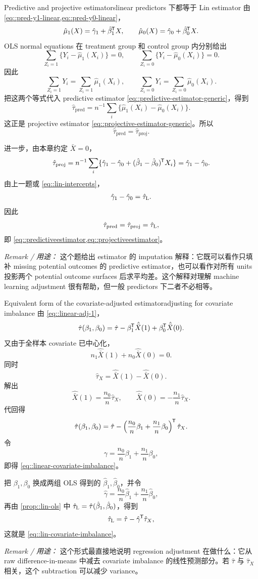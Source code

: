 \begin{exercisesolution}{Predictive and projective estimators}{linear predictors 下都等于 Lin estimator}
由 \cref{eq::pred-y1-linear,eq::pred-y0-linear}，
\[
\hat\mu_1(X)=\hat\gamma_1+\hat\beta_1^{\mkern-1.5mu\mathsf{T}} X,\qquad
\hat\mu_0(X)=\hat\gamma_0+\hat\beta_0^{\mkern-1.5mu\mathsf{T}} X.
\]
OLS normal equations 在 treatment group 和 control group 内分别给出
\[
\sum_{Z_i=1}\{Y_i-\hat\mu_1(X_i)\}=0,\qquad
\sum_{Z_i=0}\{Y_i-\hat\mu_0(X_i)\}=0.
\]
因此
\[
\sum_{Z_i=1}Y_i=\sum_{Z_i=1}\hat\mu_1(X_i),\qquad
\sum_{Z_i=0}Y_i=\sum_{Z_i=0}\hat\mu_0(X_i).
\]
把这两个等式代入 predictive estimator \cref{eq::predictive-estimator-generic}，得到
\[
\hat\tau_{\mathrm{pred}}
=n^{-1}\sum_i\{\hat\mu_1(X_i)-\hat\mu_0(X_i)\}.
\]
这正是 projective estimator \cref{eq::projective-estimator-generic}。所以
\[
\hat\tau_{\mathrm{pred}}=\hat\tau_{\mathrm{proj}}.
\]

进一步，由本章约定 $\bar X=0$，
\[
\hat\tau_{\mathrm{proj}}
=n^{-1}\sum_i
\{\hat\gamma_1-\hat\gamma_0+(\hat\beta_1-\hat\beta_0)^{\mkern-1.5mu\mathsf{T}} X_i\}
=\hat\gamma_1-\hat\gamma_0.
\]
由上一题或 \cref{eq::lin-intercepts}，
\[
\hat\gamma_1-\hat\gamma_0=\hat\tau_\textsc{L}.
\]
因此
\[
\hat\tau_{\mathrm{pred}}=\hat\tau_{\mathrm{proj}}=\hat\tau_\textsc{L},
\]
即 \cref{eq::predictiveestimator,eq::projectiveestimator}。

\emph{Remark / 用途：} 这个题给出 \citet{lin2013} estimator 的 imputation 解释：它既可以看作只填补 missing potential outcomes 的 predictive estimator，也可以看作对所有 units 投影两个 potential outcome surfaces 后求平均差。这个解释对理解 machine learning adjustment 很有帮助，但一般 predictors 下二者不必相等。
\end{exercisesolution}

\begin{exercisesolution}{Equivalent form of the covariate-adjusted estimator}{adjusting for covariate imbalance}
由 \cref{eq::linear-adj-1}，
\[
\hat\tau(\beta_1,\beta_0)
=\hat\tau-\beta_1^{\mkern-1.5mu\mathsf{T}}\hat{\bar X}(1)+\beta_0^{\mkern-1.5mu\mathsf{T}}\hat{\bar X}(0).
\]
又由于全样本 covariate 已中心化，
\[
n_1\hat{\bar X}(1)+n_0\hat{\bar X}(0)=0.
\]
同时
\[
\hat\tau_X=\hat{\bar X}(1)-\hat{\bar X}(0).
\]
解出
\[
\hat{\bar X}(1)=\frac{n_0}{n}\hat\tau_X,\qquad
\hat{\bar X}(0)=-\frac{n_1}{n}\hat\tau_X.
\]
代回得
\[
\hat\tau(\beta_1,\beta_0)
=\hat\tau-\left(\frac{n_0}{n}\beta_1+\frac{n_1}{n}\beta_0\right)^{\mkern-1.5mu\mathsf{T}}\hat\tau_X.
\]
令
\[
\gamma=\frac{n_0}{n}\beta_1+\frac{n_1}{n}\beta_0,
\]
即得 \cref{eq::linear-covariate-imbalance}。

把 $\beta_1,\beta_0$ 换成两组 OLS 得到的 $\hat\beta_1,\hat\beta_0$，并令
\[
\hat\gamma=\frac{n_0}{n}\hat\beta_1+\frac{n_1}{n}\hat\beta_0,
\]
再由 \cref{prop::lin-ols} 中 $\hat\tau_\textsc{L}=\hat\tau(\hat\beta_1,\hat\beta_0)$，得到
\[
\hat\tau_\textsc{L}
=\hat\tau-\hat\gamma^{\mkern-1.5mu\mathsf{T}}\hat\tau_X,
\]
这就是 \cref{eq::lin-covariate-imbalance}。

\emph{Remark / 用途：} 这个形式最直接地说明 regression adjustment 在做什么：它从 raw difference-in-means 中减去 covariate imbalance 的线性预测部分。若 $\hat\tau$ 与 $\hat\tau_X$ 相关，这个 subtraction 可以减少 variance。
\end{exercisesolution}

